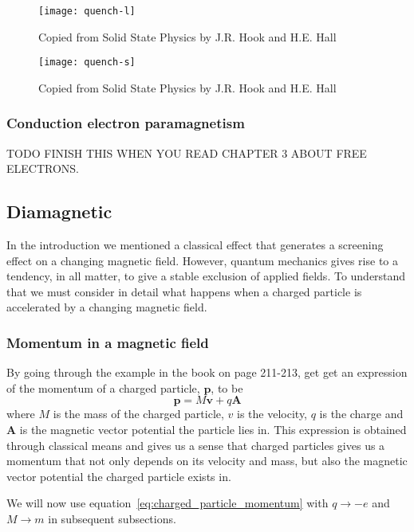 \documentclass[11pt]{article}
\begin{document}
\begin{figure}[!h]
	\centering
	\texttt{[image: quench-l]}
	\caption{Copied from Solid State Physics by J.R. Hook and H.E. Hall}
	\label{fig:quench-l}
\end{figure}

\begin{figure}[!h]
	\centering
	\texttt{[image: quench-s]}
	\caption{Copied from Solid State Physics by J.R. Hook and H.E. Hall}
	\label{fig:quench-s}
\end{figure}

\newpage
\subsubsection{Conduction electron paramagnetism}
TODO
FINISH THIS WHEN YOU READ CHAPTER 3 ABOUT FREE ELECTRONS.


\newpage
\subsection{Diamagnetic}
In the introduction we mentioned a classical effect that generates a screening effect on a changing magnetic field. However, quantum mechanics gives rise to a tendency, in all matter, to give a stable exclusion of applied fields. To understand that we must consider in detail what happens when a charged particle is accelerated by a changing magnetic field.

\subsubsection{Momentum in a magnetic field}
By going through the example in the book on page 211-213, get get an expression of the momentum of a charged particle, $\pmb{p}$, to be
\begin{equation}
	\pmb{p} = M\pmb{v} + q\pmb{A}
	\label{eq:charged_particle_momentum}
\end{equation}
where $M$ is the mass of the charged particle, $v$ is the velocity, $q$ is the charge and $\pmb{A}$ is the magnetic vector potential the particle lies in. This expression is obtained through classical means and gives us a sense that charged particles gives us a momentum that not only depends on its velocity and mass, but also the magnetic vector potential the charged particle exists in.

We will now use equation~\ref{eq:charged_particle_momentum} with $q \to -e$ and $M \to m$ in subsequent subsections.
\end{document}
